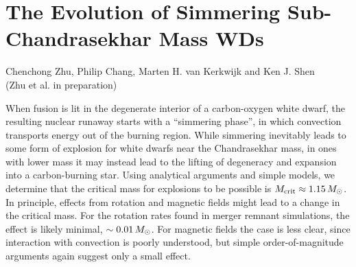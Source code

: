 \chapter{The Evolution of Simmering Sub-Chandrasekhar Mass WDs}
\label{ch:ch5}

\begin{center}
\begin{minipage}[c]{4.75in}
Chenchong Zhu, Philip Chang, Marten H. van Kerkwijk and Ken J. Shen\\
(Zhu et al. in preparation)
\vspace{2em}
\end{minipage}
\end{center}

When fusion is lit in the degenerate interior of a carbon-oxygen white dwarf, the resulting nuclear runaway starts with a ``simmering phase'', in which convection transports energy out of the burning region. 
While simmering inevitably leads to some form of explosion for white dwarfs near the Chandrasekhar mass, in ones with lower mass it may instead lead to the lifting of degeneracy and expansion into a carbon-burning star.
Using analytical arguments and simple models, we determine that the critical mass for explosions to be possible is $\Mcrit \approx 1.15\,\Msun$.  In principle, effects from rotation and magnetic fields might lead to a change in the critical mass.  For the rotation rates found in merger remnant simulations, the effect is likely minimal, $\sim0.01\,\Msun$.  For magnetic fields the case is less clear, since interaction with convection is poorly understood, but simple order-of-magnitude arguments again suggest only a small effect.
